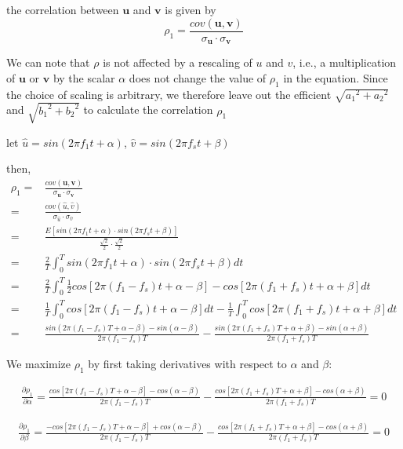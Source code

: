 \documentclass{article}
\begin{document}
the correlation between $\mathbf{u}$ and $\mathbf{v}$ is given by
$$\rho_1 = \frac{cov(\mathbf{u},\mathbf{v})}{\sigma_\mathbf{u} \cdot \sigma_\mathbf{v}}$$

We can note that $\rho$ is not affected by a rescaling of $u$ and $v$, i.e., a multiplication of $\mathbf{u}$ or $\mathbf{v}$ by the scalar $\alpha$ does not change the value of $\rho_1$ in the equation. Since the choice of scaling is arbitrary, we therefore leave out the efficient  $\sqrt{{a_{1}}^{2} + {a_{2}}^{2}}$ and  $\sqrt{{b_{1}}^{2} + {b_{2}}^{2}}$ to calculate the correlation $\rho_1$

let $\hat{u} = sin(2\pi f_1t + \alpha)$, $\hat{v} = sin(2\pi f_st + \beta)$

then,
\begin{align}
\rho_1  =& \frac{cov(\mathbf{u},\mathbf{v})}{\sigma_\mathbf{u} \cdot \sigma_\mathbf{v}} \nonumber \\
        =& \frac{cov(\hat{u},\hat{v})}{\sigma_{\hat{u}} \cdot \sigma_{\hat{v}}} \nonumber \\
        =& \frac{E[sin(2\pi f_1t + \alpha) \cdot sin(2\pi f_st + \beta)]} {\frac{\sqrt{2}}{2} \cdot \frac{\sqrt{2}}{2}} \nonumber \\
        =& \frac{2}{T}\int_0^T sin(2\pi f_1t + \alpha) \cdot sin(2\pi f_st + \beta) dt \nonumber \\
        =& \frac{2}{T}\int_0^T \frac{1}{2}cos[2\pi (f_1 - f_s)t + \alpha - \beta] - cos[2\pi (f_1 + f_s)t + \alpha + \beta] dt \nonumber \\
        =& \frac{1}{T}\int_0^T cos[2\pi (f_1 - f_s)t + \alpha - \beta] dt - \frac{1}{T}\int_0^T cos[2\pi (f_1 + f_s)t + \alpha + \beta] dt \nonumber \\
        =& \frac{sin(2\pi (f_1 - f_s)T + \alpha - \beta) - sin(\alpha - \beta)}{2\pi (f_1 - f_s)T} - \frac{sin(2\pi (f_1 + f_s)T + \alpha + \beta) - sin(\alpha + \beta)}{2\pi (f_1 + f_s)T} \nonumber
\end{align}

We maximize $\rho_1$ by first taking derivatives with respect to $\alpha$ and $\beta$:

\begin{align*}
\frac{\partial \rho_1}{\partial \alpha} = \frac{cos[2\pi (f_1 - f_s)T + \alpha - \beta] - cos(\alpha - \beta)}{2\pi (f_1 - f_s)T} - \frac{cos[2\pi (f_1 + f_s)T + \alpha + \beta] - cos(\alpha + \beta)}{2\pi (f_1 + f_s)T} = 0
\end{align*}

\begin{align*}
\frac{\partial \rho_1}{\partial \beta} = \frac{-cos[2\pi (f_1 - f_s)T + \alpha - \beta] + cos(\alpha - \beta)}{2\pi (f_1 - f_s)T} - \frac{cos[2\pi (f_1 + f_s)T + \alpha + \beta] - cos(\alpha + \beta)}{2\pi (f_1 + f_s)T} = 0
\end{align*}
\end{document}
